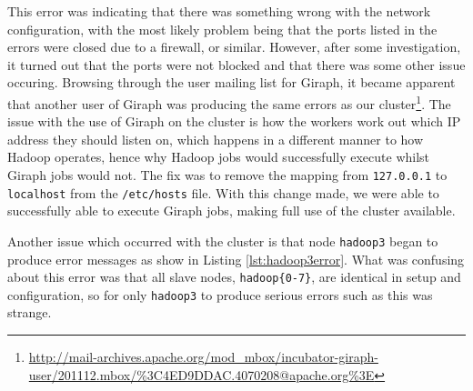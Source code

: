 This error was indicating that there was something wrong with the network configuration, with the most likely problem being that the ports listed in the errors were closed due to a firewall, or similar. However, after some investigation, it turned out that the ports were not blocked and that there was some other issue occuring. Browsing through the user mailing list for Giraph, it became apparent that another user of Giraph was producing the same errors as our cluster\footnote{\url{http://mail-archives.apache.org/mod_mbox/incubator-giraph-user/201112.mbox/\%3C4ED9DDAC.4070208@apache.org\%3E}}. The issue with the use of Giraph on the cluster is how the workers work out which IP address they should listen on, which happens in a different manner to how Hadoop operates, hence why Hadoop jobs would successfully execute whilst Giraph jobs would not. The fix was to remove the mapping from {\tt 127.0.0.1} to {\tt localhost} from the {\tt /etc/hosts} file. With this change made, we were able to successfully able to execute Giraph jobs, making full use of the cluster available.

Another issue which occurred with the cluster is that node {\tt hadoop3} began to produce error messages as show in Listing \ref{lst:hadoop3error}. What was confusing about this error was that all slave nodes, {\tt hadoop\{0-7\}}, are identical in setup and configuration, so for only {\tt hadoop3} to produce serious errors such as this was strange.

